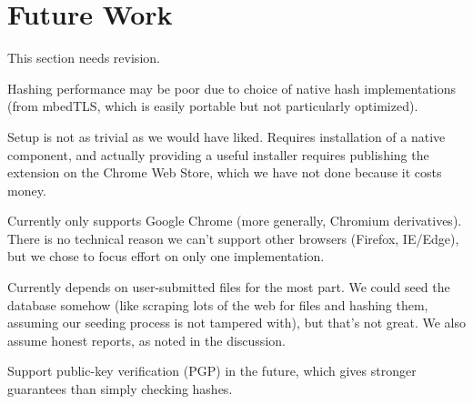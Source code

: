 \documentclass[letterpaper,twocolumn,10pt]{article}
\begin{document}
\section{Future Work}

This section needs revision.

Hashing performance may be poor due to choice of native hash implementations (from mbedTLS, which is easily portable but not particularly optimized).

Setup is not as trivial as we would have liked. Requires installation of a native component, and actually providing a useful installer requires publishing the extension on the Chrome Web Store, which we have not done because it costs money.

Currently only supports Google Chrome (more generally, Chromium derivatives). There is no technical reason we can't support other browsers (Firefox, IE/Edge), but we chose to focus effort on only one implementation.

Currently depends on  user-submitted files for the most part. We could seed the database somehow (like scraping lots of the web for files and hashing them, assuming our seeding process is not tampered with), but that’s not great. We also assume honest reports, as noted in the discussion.

Support public-key verification (PGP) in the future, which gives stronger guarantees than simply checking hashes.

{\footnotesize 
}
\end{document}

